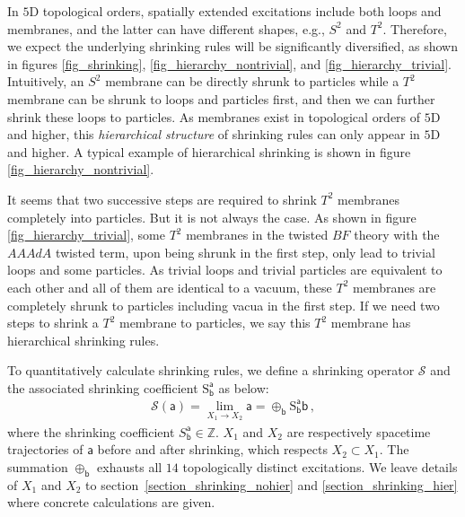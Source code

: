 \documentclass[11pt,nofootinbib,preprint]{revtex4-1}
\def\Z{\mathbb{Z}}
\begin{document}
In $5$D topological orders, spatially extended excitations include both loops and membranes, and the latter can have different shapes, e.g., $S^2$ and $T^2$. Therefore, we expect the underlying shrinking rules will be significantly diversified, as shown in figures \ref{fig_shrinking}, \ref{fig_hierarchy_nontrivial},  and \ref{fig_hierarchy_trivial}. Intuitively,  an $S^2$ membrane can be directly shrunk to particles while a $T^2$ membrane can be shrunk to loops and particles first, and then we can further  shrink these loops to particles. As membranes exist in topological orders of $5$D and higher, this \textit{hierarchical structure} of shrinking rules can only appear in $5$D and higher. A typical example of hierarchical shrinking is shown in figure \ref{fig_hierarchy_nontrivial}. 

It seems that   two successive steps are required to shrink $T^2$ membranes completely into particles. But it is not always the case. As shown in figure \ref{fig_hierarchy_trivial}, some $T^2$ membranes in the twisted $BF$ theory with the $AAAdA$ twisted term, upon being shrunk in the first step, only lead to trivial loops and some particles. As trivial loops and trivial particles are equivalent to each other and all of them are identical to a vacuum, these $T^2$ membranes are completely shrunk to particles including vacua in the first step. If we need two steps to shrink a $T^2$ membrane to particles, we say this $T^2$ membrane has hierarchical shrinking rules. 
 
 
 
To quantitatively calculate shrinking rules, we  define a shrinking operator $\mathcal{S}$ and the associated shrinking coefficient $\mathrm{S}_{\mathsf{b}}^{\mathsf{a}}$ as below:
\begin{align}
\mathcal{S}\left(\mathsf{a}\right)=\underset{X_{1}\rightarrow X_{2}}{\lim}\mathsf{a}=\oplus_{\mathsf{b}} \mathrm{S}^{\mathsf{a}}_{\mathsf{b}} \mathsf{b}\,,
\end{align}
where the shrinking coefficient $S^{\mathsf{a}}_{\mathsf{b}}\in\Z$. $X_1$ and $X_2$ are respectively  spacetime trajectories of $\mathsf{a}$ before and after shrinking, which respects $X_2\subset X_1$.   The summation   $\oplus_{\mathsf{b}}$ exhausts all $14$ topologically distinct excitations.  We leave details of $X_1$ and $X_2$ to section~\ref{section_shrinking_nohier} and \ref{section_shrinking_hier} where concrete calculations are given.  
 
\end{document}
